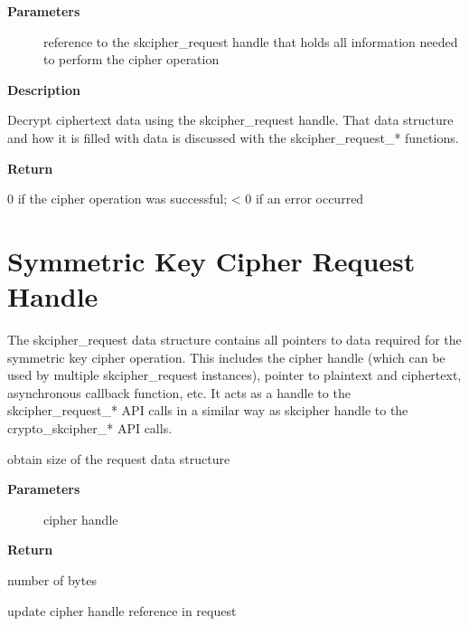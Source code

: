 \documentclass[a4paper,8pt,english]{sphinxmanual}
\begin{document}
\textbf{Parameters}
\begin{description}
\item[{}] \leavevmode
reference to the skcipher\_request handle that holds all information
needed to perform the cipher operation

\end{description}

\textbf{Description}

Decrypt ciphertext data using the skcipher\_request handle. That data
structure and how it is filled with data is discussed with the
skcipher\_request\_* functions.

\textbf{Return}

0 if the cipher operation was successful; \textless{} 0 if an error occurred


\section{Symmetric Key Cipher Request Handle}
\label{crypto/api-skcipher:symmetric-key-cipher-request-handle}
The skcipher\_request data structure contains all pointers to data
required for the symmetric key cipher operation. This includes the cipher
handle (which can be used by multiple skcipher\_request instances), pointer
to plaintext and ciphertext, asynchronous callback function, etc. It acts
as a handle to the skcipher\_request\_* API calls in a similar way as
skcipher handle to the crypto\_skcipher\_* API calls.

\begin{fulllineitems}
\label{crypto/api-skcipher:c.crypto_skcipher_reqsize}
obtain size of the request data structure

\end{fulllineitems}


\textbf{Parameters}
\begin{description}
\item[{}] \leavevmode
cipher handle

\end{description}

\textbf{Return}

number of bytes

\begin{fulllineitems}
\label{crypto/api-skcipher:c.skcipher_request_set_tfm}
update cipher handle reference in request

\end{fulllineitems}
\end{document}

